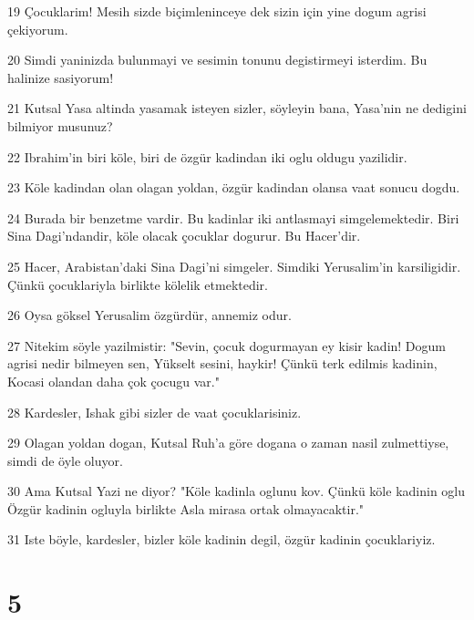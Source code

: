 \par 19 Çocuklarim! Mesih sizde biçimleninceye dek sizin için yine dogum agrisi çekiyorum.
\par 20 Simdi yaninizda bulunmayi ve sesimin tonunu degistirmeyi isterdim. Bu halinize sasiyorum!
\par 21 Kutsal Yasa altinda yasamak isteyen sizler, söyleyin bana, Yasa'nin ne dedigini bilmiyor musunuz?
\par 22 Ibrahim'in biri köle, biri de özgür kadindan iki oglu oldugu yazilidir.
\par 23 Köle kadindan olan olagan yoldan, özgür kadindan olansa vaat sonucu dogdu.
\par 24 Burada bir benzetme vardir. Bu kadinlar iki antlasmayi simgelemektedir. Biri Sina Dagi'ndandir, köle olacak çocuklar dogurur. Bu Hacer'dir.
\par 25 Hacer, Arabistan'daki Sina Dagi'ni simgeler. Simdiki Yerusalim'in karsiligidir. Çünkü çocuklariyla birlikte kölelik etmektedir.
\par 26 Oysa göksel Yerusalim özgürdür, annemiz odur.
\par 27 Nitekim söyle yazilmistir: "Sevin, çocuk dogurmayan ey kisir kadin! Dogum agrisi nedir bilmeyen sen, Yükselt sesini, haykir! Çünkü terk edilmis kadinin, Kocasi olandan daha çok çocugu var."
\par 28 Kardesler, Ishak gibi sizler de vaat çocuklarisiniz.
\par 29 Olagan yoldan dogan, Kutsal Ruh'a göre dogana o zaman nasil zulmettiyse, simdi de öyle oluyor.
\par 30 Ama Kutsal Yazi ne diyor? "Köle kadinla oglunu kov. Çünkü köle kadinin oglu Özgür kadinin ogluyla birlikte Asla mirasa ortak olmayacaktir."
\par 31 Iste böyle, kardesler, bizler köle kadinin degil, özgür kadinin çocuklariyiz.

\chapter{5}

